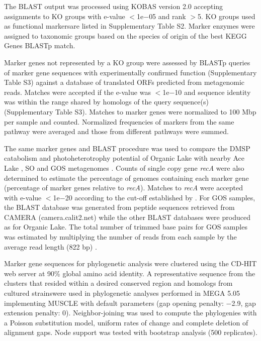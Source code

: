 The \ac{BLAST} output was processed using \ac{KOBAS} version 2.0 \cite{Xie2011} accepting assignments to \ac{KO} groups with e-value $<$1e$-$05 and rank $>$5. 
\ac{KO} groups used as functional markersare listed in Supplementary Table S2. 
Marker enzymes were assigned to taxonomic groups based on the species of origin of the best \ac{KEGG} Genes \ac{BLAST}p match. 

Marker genes not represented by a \ac{KO} group were assessed by \ac{BLAST}p queries of marker gene sequences with experimentally confirmed function (Supplementary Table S3) against a database of translated \acp{ORF} predicted from metagenomic reads. 
Matches were accepted if the e-value was $<$1e$-$10 and sequence identity was within the range shared by homologs of the query sequence(s) (Supplementary Table S3).
Matches to marker genes were normalized to 100 Mbp per sample and counted. 
Normalized frequencies of markers from the same pathway were averaged and those from different pathways were summed. 

The same marker genes and \ac{BLAST} procedure was used to compare the \ac{DMSP} catabolism and photoheterotrophy potential of Organic Lake with nearby Ace Lake \cite{Lauro2011}, \ac{SO} \cite{Wilkins2012b} and \ac{GOS} metagenomes \cite{Rusch2007}. 
Counts of single copy gene \emph{recA} were also determined to estimate the percentage of genomes containing each marker gene (percentage of marker genes relative to \emph{recA}). 
Matches to \emph{recA} were accepted with e-value $<$1e$-$20 according to the cut-off established by \citet{Howard2008}. 
For \ac{GOS} samples, the \ac{BLAST} database was generated from peptide sequences retrieved from \ac{CAMERA} (camera.calit2.net) while the other \ac{BLAST} databases were produced as for Organic Lake. 
The total number of trimmed base pairs for \ac{GOS} samples was estimated by multiplying the number of reads from each sample by the average read length (822 bp) \cite{Rusch2007}. 

Marker gene sequences for phylogenetic analysis were clustered using the CD-HIT web server \cite{Huang2010} at 90\% global amino acid identity. 
A representative sequence from the clusters that resided within a desired conserved region and homologs from cultured strainswere used in phylogenetic analyses performed in MEGA 5.05 \cite{Tamura2011} implementing MUSCLE with default parameters (gap opening penalty: $-$2.9, gap extension penalty: 0). 
Neighbor-joining was used to compute the phylogenies with a Poisson substitution model, uniform rates of change and complete deletion of alignment gaps. 
Node support was tested with bootstrap analysis (500 replicates). 

